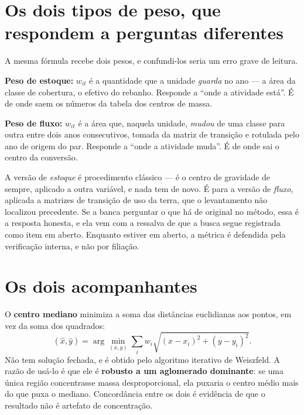 \section{Os dois tipos de peso, que respondem a perguntas diferentes}

A mesma fórmula recebe dois pesos, e confundi-los seria um erro grave de
leitura.

\textbf{Peso de estoque:} $w_{it}$ é a quantidade que a unidade \emph{guarda}
no ano --- a área da classe de cobertura, o efetivo do rebanho. Responde a
``onde a atividade está''. É de onde saem os números da tabela dos centros de
massa.

\textbf{Peso de fluxo:} $w_{it}$ é a área que, naquela unidade, \emph{mudou} de
uma classe para outra entre dois anos consecutivos, tomada da matriz de
transição e rotulada pelo ano de origem do par. Responde a ``onde a atividade
muda''. É de onde sai o centro da conversão.

\begin{armadilha}
A versão de \emph{estoque} é procedimento clássico --- é o centro de gravidade
de sempre, aplicado a outra variável, e nada tem de novo. É para a versão de
\emph{fluxo}, aplicada a matrizes de transição de uso da terra, que o
levantamento não localizou precedente. Se a banca perguntar o que há de
original no método, essa é a resposta honesta, e ela vem com a ressalva de que
a busca segue registrada como item em aberto. Enquanto estiver em aberto, a
métrica é defendida pela verificação interna, e não por filiação.
\end{armadilha}

\section{Os dois acompanhantes}

O \textbf{centro mediano} minimiza a soma das distâncias euclidianas aos
pontos, em vez da soma dos quadrados:
\begin{equation}
(\hat{x}, \hat{y}) = \arg\min_{(x,y)} \sum_{i} w_i \sqrt{(x - x_i)^2 + (y - y_i)^2}.
\end{equation}
Não tem solução fechada, e é obtido pelo algoritmo iterativo de Weiszfeld. A
razão de usá-lo é que ele é \textbf{robusto a um aglomerado dominante}: se uma
única região concentrasse massa desproporcional, ela puxaria o centro médio
mais do que puxa o mediano. Concordância entre os dois é evidência de que o
resultado não é artefato de concentração.

